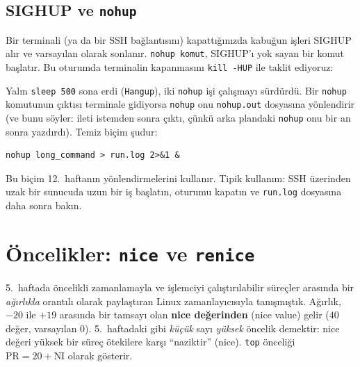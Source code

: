 \documentclass[11pt,a4paper]{article}
\newcommand{\term}[1]{\textbf{\color{mintdeep}#1}}
\newcommand{\cmd}[1]{\texttt{#1}}
\begin{document}
\subsection{SIGHUP ve \texttt{nohup}}
\label{sec:nohup}

Bir terminali (ya da bir SSH bağlantısını) kapattığınızda kabuğun işleri SIGHUP alır ve varsayılan olarak sonlanır. \cmd{nohup komut}, SIGHUP'ı yok sayan bir komut başlatır. Bu oturumda terminalin kapanmasını \cmd{kill -HUP} ile taklit ediyoruz:



Yalın \cmd{sleep 500} sona erdi (\texttt{Hangup}), iki \cmd{nohup} işi çalışmayı sürdürdü. Bir \cmd{nohup} komutunun çıktısı terminale gidiyorsa \cmd{nohup} onu \texttt{nohup.out} dosyasına yönlendirir (ve bunu söyler: ileti istemden sonra çıktı, çünkü arka plandaki \cmd{nohup} onu bir an sonra yazdırdı). Temiz biçim şudur:
\begin{lstlisting}[style=term]
nohup long_command > run.log 2>&1 &
\end{lstlisting}
Bu biçim 12.~haftanın yönlendirmelerini kullanır. Tipik kullanım: SSH üzerinden uzak bir sunucuda uzun bir iş başlatın, oturumu kapatın ve \texttt{run.log} dosyasına daha sonra bakın.

\section{Öncelikler: \texttt{nice} ve \texttt{renice}}
\label{sec:nice}

5.~haftada öncelikli zamanlamayla ve işlemciyi çalıştırılabilir süreçler arasında bir \emph{ağırlıkla} orantılı olarak paylaştıran Linux zamanlayıcısıyla tanışmıştık. Ağırlık, $-20$ ile $+19$ arasında bir tamsayı olan \term{nice değerinden} (nice value) gelir ($40$ değer, varsayılan $0$). 5.~haftadaki gibi \emph{küçük} sayı \emph{yüksek} öncelik demektir: nice değeri yüksek bir süreç ötekilere karşı ``naziktir'' (nice). \cmd{top} önceliği $\text{PR} = 20 + \text{NI}$ olarak gösterir.


\end{document}
